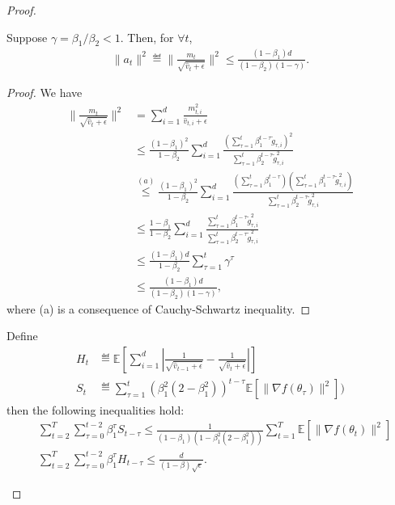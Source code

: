\documentclass[11pt]{article}
\begin{document}
\begin{proof}
\begin{Lemma} \label{bound:a_t}
Suppose $\gamma=\beta_1/\beta_2<1$. Then, for $\forall t$,
\begin{align*}
    \|a_t\|^2\eqdef \|\frac{m_t}{\sqrt{\hat v_t+\epsilon}} \|^2\leq \frac{(1-\beta_1)d}{(1-\beta_2)(1-\gamma)}.
\end{align*}

\end{Lemma}

\begin{proof}
We have
\begin{align*}
    \|\frac{m_t}{\sqrt{\hat v_t+\epsilon}} \|^2&=\sum_{i=1}^d \frac{m_{t,i}^2}{\hat v_{t,i}+\epsilon}\\
    &\leq \frac{(1-\beta_1)^2}{1-\beta_2}\sum_{i=1}^d \frac{(\sum_{\tau=1}^t \beta_1^{t-\tau} \tilde g_{\tau,i})^2}{\sum_{\tau=1}^t \beta_2^{t-\tau} \tilde g_{\tau,i}^2}\\
    &\overset{(a)}{\leq} \frac{(1-\beta_1)^2}{1-\beta_2}\sum_{i=1}^d \frac{(\sum_{\tau=1}^t \beta_1^{t-\tau})(\sum_{\tau=1}^t \beta_1^{t-\tau}\tilde g_{\tau,i}^2)}{\sum_{\tau=1}^t \beta_2^{t-\tau} \tilde g_{\tau,i}^2}\\
    &\leq \frac{1-\beta_1}{1-\beta_2}\sum_{i=1}^d \frac{\sum_{\tau=1}^t \beta_1^{t-\tau}\tilde g_{\tau,i}^2}{\sum_{\tau=1}^t \beta_2^{t-\tau} \tilde g_{\tau,i}^2}\\
    &\leq \frac{(1-\beta_1)d}{1-\beta_2} \sum_{\tau=1}^t \gamma^\tau\\
    &\leq \frac{(1-\beta_1)d}{(1-\beta_2)(1-\gamma)},
\end{align*}
where (a) is a consequence of Cauchy-Schwartz inequality.
\end{proof}


\begin{Lemma} \label{lemma:H,S}
Define
\begin{align*}
H_t &\eqdef \mathbb E[\sum_{i=1}^d |\frac{1}{\sqrt{\hat v_{t-1}+\epsilon}}-\frac{1}{\sqrt{\hat v_t+\epsilon}}| ]\\
S_t & \eqdef \sum_{\tau=1}^t (\beta_1^2(2-\beta_1^2))^{t-\tau}\mathbb E[\|\nabla f(\theta_\tau)\|^2])
\end{align*}
then the following inequalities hold:
\begin{align*}
    &\sum_{t=2}^T\sum_{\tau=0}^{t-2}\beta_1^\tau S_{t-\tau}\leq \frac{1}{(1-\beta_1)(1-\beta_1^2(2-\beta_1^2))}\sum_{t=1}^T \mathbb E[\|\nabla f(\theta_t)\|^2]\\
    &\sum_{t=2}^T \sum_{\tau=0}^{t-2} \beta_1^\tau H_{t-\tau}\leq \frac{d}{(1-\beta)\sqrt\epsilon}.
\end{align*}
\end{Lemma}


\end{proof}
\end{document}
